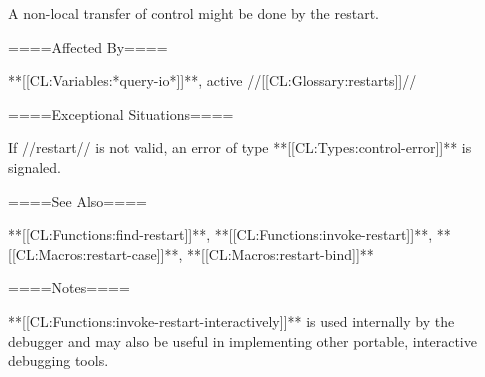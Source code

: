 A non-local transfer of control might be done by the restart.

====Affected By====

**[[CL:Variables:*query-io*]]**, active //[[CL:Glossary:restarts]]//

====Exceptional Situations====

If //restart// is not valid, an error of type **[[CL:Types:control-error]]** is signaled.

====See Also====

**[[CL:Functions:find-restart]]**, **[[CL:Functions:invoke-restart]]**, **[[CL:Macros:restart-case]]**, **[[CL:Macros:restart-bind]]**

====Notes====

**[[CL:Functions:invoke-restart-interactively]]** is used internally by the debugger and may also be useful in implementing other portable, interactive debugging tools.

